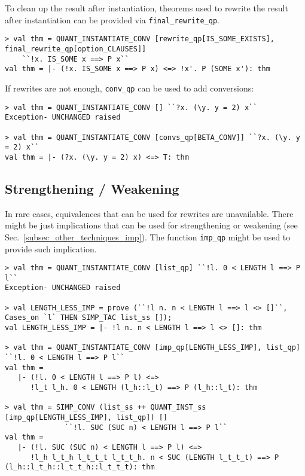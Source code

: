 \documentclass[a4paper,12pt,DIV=12,oneside]{scrbook}
\theoremstyle{definition}
\theoremstyle{remark}
\begin{document}
To clean up the result after instantiation, theorems used to rewrite the result after instantiation can be provided via
\texttt{final\_rewrite\_qp}.

{\scriptsize
\begin{verbatim}
> val thm = QUANT_INSTANTIATE_CONV [rewrite_qp[IS_SOME_EXISTS], final_rewrite_qp[option_CLAUSES]] 
    ``!x. IS_SOME x ==> P x``
val thm = |- (!x. IS_SOME x ==> P x) <=> !x'. P (SOME x'): thm
\end{verbatim}}

If rewrites are not enough, \texttt{conv\_qp} can be used to add conversions:

{\scriptsize
\begin{verbatim}
> val thm = QUANT_INSTANTIATE_CONV [] ``?x. (\y. y = 2) x`` 
Exception- UNCHANGED raised

> val thm = QUANT_INSTANTIATE_CONV [convs_qp[BETA_CONV]] ``?x. (\y. y = 2) x``
val thm = |- (?x. (\y. y = 2) x) <=> T: thm
\end{verbatim}}

\subsection{Strengthening / Weakening}

In rare cases, equivalences that can be used for rewrites are unavailable. There might be just implications that
can be used for strengthening or weakening (see Sec.~\ref{subsec_other_techniques_imp}). The function
\texttt{imp\_qp} might be used to provide such implication.

{\scriptsize
\begin{verbatim}
> val thm = QUANT_INSTANTIATE_CONV [list_qp] ``!l. 0 < LENGTH l ==> P l`` 
Exception- UNCHANGED raised

> val LENGTH_LESS_IMP = prove (``!l n. n < LENGTH l ==> l <> []``, Cases_on `l` THEN SIMP_TAC list_ss []);
val LENGTH_LESS_IMP = |- !l n. n < LENGTH l ==> l <> []: thm

> val thm = QUANT_INSTANTIATE_CONV [imp_qp[LENGTH_LESS_IMP], list_qp] ``!l. 0 < LENGTH l ==> P l``
val thm =
   |- (!l. 0 < LENGTH l ==> P l) <=>
      !l_t l_h. 0 < LENGTH (l_h::l_t) ==> P (l_h::l_t): thm

> val thm = SIMP_CONV (list_ss ++ QUANT_INST_ss [imp_qp[LENGTH_LESS_IMP], list_qp]) [] 
              ``!l. SUC (SUC n) < LENGTH l ==> P l``
val thm =
   |- (!l. SUC (SUC n) < LENGTH l ==> P l) <=>
      !l_h l_t_h l_t_t_t l_t_t_h. n < SUC (LENGTH l_t_t_t) ==> P (l_h::l_t_h::l_t_t_h::l_t_t_t): thm
\end{verbatim}}
\end{document}
